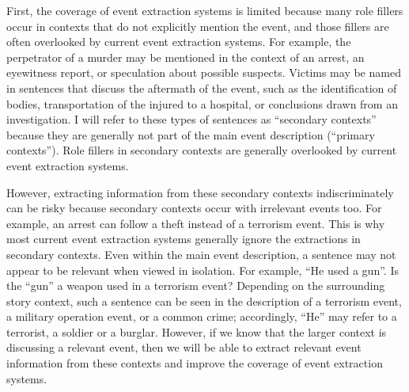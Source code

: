 First, the coverage of event extraction systems is limited because many role fillers occur in contexts
that do not explicitly mention the event, and those
fillers are often overlooked by current event extraction systems. For example, the perpetrator
of a murder may be mentioned in the context
of an arrest, an eyewitness report, or speculation
about possible suspects. Victims may be named
in sentences that discuss the aftermath of the event,
such as the identification of bodies, transportation
of the injured to a hospital, or conclusions drawn
from an investigation. I will refer to these types of
sentences as ``secondary contexts'' because they are
generally not part of the main event description (``primary contexts'').
Role fillers in secondary contexts are generally overlooked by current event extraction systems. 

However, extracting information from these secondary contexts indiscriminately
can be risky because secondary contexts occur with irrelevant events too.
For example, an arrest can follow a theft instead of a terrorism event.
This is why most current event extraction systems generally ignore the extractions in secondary contexts. 
Even within the main event description, a sentence may not 
appear to be relevant when viewed in isolation. 
For example, ``He used a gun''. Is the ``gun'' a weapon used in a terrorism event? Depending on the surrounding story context, 
such a sentence can be seen in the description of a terrorism event, a military operation event, or a common crime; accordingly, 
``He'' may refer to a terrorist, a soldier or a burglar.
However, if we know that the larger context is discussing a relevant event, 
then we will be able to extract relevant event information from these contexts and improve the coverage of event extraction systems.

